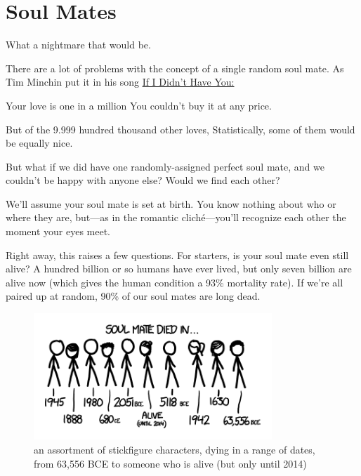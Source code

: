 {
\chapter{Soul Mates}
}

\hfill{}

{What a nightmare that would be.}

{There are a lot of problems with the concept of a single random soul mate. As Tim Minchin put it in his song \href{http://www.youtube.com/watch?v=Gaid72fqzNE}{If I Didn’t Have You:}}

{Your love is one in a million
You couldn’t buy it at any price.}

{But of the 9.999 hundred thousand other loves,
Statistically, some of them would be equally nice.}

{But what if we did have one randomly-assigned perfect soul mate, and we couldn’t be happy with anyone else? Would we find each other?}

{We’ll assume your soul mate is set at birth. You know nothing about who or where they are, but—as in the romantic cliché—you’ll recognize each other the moment your eyes meet.}

{Right away, this raises a few questions. For starters, is your soul mate even still alive? A hundred billion or so humans have ever lived, but only seven billion are alive now (which gives the human condition a 93\% mortality rate). If we’re all paired up at random, 90\% of our soul mates are long dead.}

\begin{figure}[!htbp]
\centering
\includegraphics[scale=0.5, max width=0.8\textwidth]{imgs/a/9/soulmates_died.png}
\caption{an assortment of stickfigure characters, dying in a range of dates, from 63,556 BCE to someone who is alive (but only until 2014)}
\end{figure}

